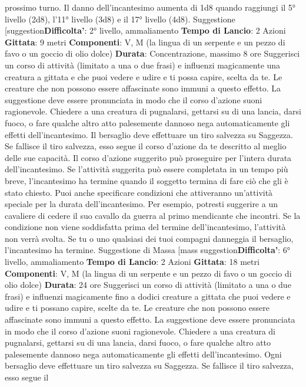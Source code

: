\begin{multicols}{2}
prossimo turno.
Il danno dell’incantesimo aumenta di 1d8 quando
raggiungi il 5° livello (2d8), l’11° livello (3d8) e il 17°
livello (4d8).
Suggestione
[suggestion\textbf{Difficolta'}:
2° livello, ammaliamento
\textbf{Tempo di Lancio}: 2 Azioni
\textbf{Gittata}: 9 metri
\textbf{Componenti}: V, M (la lingua di un serpente e un pezzo
di favo o un goccio di olio dolce)
\textbf{Durata}: Concentrazione, massimo 8 ore
Suggerisci un corso di attività (limitato a una o due
frasi) e influenzi magicamente una creatura a gittata e
che puoi vedere e udire e ti possa capire, scelta da te.
Le creature che non possono essere affascinate sono
immuni a questo effetto. La suggestione deve essere
pronunciata in modo che il corso d’azione suoni
ragionevole. Chiedere a una creatura di pugnalarsi,
gettarsi su di una lancia, darsi fuoco, o fare qualche
altro atto palesemente dannoso nega automaticamente
gli effetti dell’incantesimo.
Il bersaglio deve effettuare un tiro salvezza su
Saggezza. Se fallisce il tiro salvezza, esso segue il
corso d’azione da te descritto al meglio delle sue
capacità. Il corso d’azione suggerito può proseguire per
l’intera durata dell’incantesimo. Se l’attività suggerita
può essere completata in un tempo più breve,
l’incantesimo ha termine quando il soggetto termina di
fare ciò che gli è stato chiesto.
Puoi anche specificare condizioni che attiveranno
un’attività speciale per la durata dell’incantesimo. Per
esempio, potresti suggerire a un cavaliere di cedere il
suo cavallo da guerra al primo mendicante che incontri.
Se la condizione non viene soddisfatta prima del
termine dell’incantesimo, l’attività non verrà svolta.
Se tu o uno qualsiasi dei tuoi compagni danneggia il
bersaglio, l’incantesimo ha termine.
Suggestione di Massa
[mass suggestion\textbf{Difficolta'}:
6° livello, ammaliamento
\textbf{Tempo di Lancio}: 2 Azioni
\textbf{Gittata}: 18 metri
\textbf{Componenti}: V, M (la lingua di un serpente e un pezzo
di favo o un goccio di olio dolce)
\textbf{Durata}: 24 ore
Suggerisci un corso di attività (limitato a una o due
frasi) e influenzi magicamente fino a dodici creature a
gittata che puoi vedere e udire e ti possano capire,
scelte da te. Le creature che non possono essere
affascinate sono immuni a questo effetto. La
suggestione deve essere pronunciata in modo che il
corso d’azione suoni ragionevole. Chiedere a una
creatura di pugnalarsi, gettarsi su di una lancia, darsi
fuoco, o fare qualche altro atto palesemente dannoso
nega automaticamente gli effetti dell’incantesimo.
Ogni bersaglio deve effettuare un tiro salvezza su
Saggezza. Se fallisce il tiro salvezza, esso segue il

\end{multicols}
